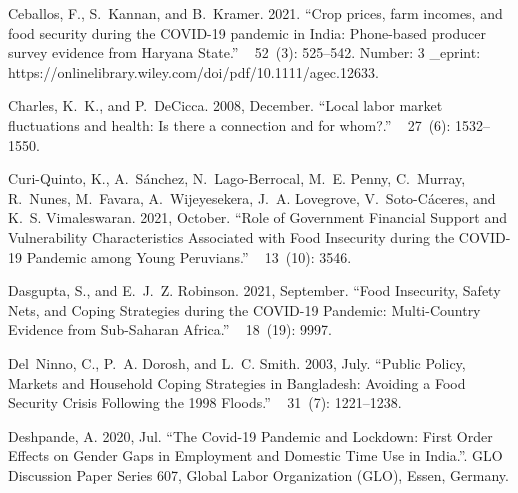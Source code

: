 \documentclass{wber}
\begin{document}
\begin{thebibliography}{}
Ceballos, F., S.~Kannan, and B.~Kramer. 2021.
\newblock ``Crop prices, farm incomes, and food security during the {COVID}-19
  pandemic in {India}: {Phone}-based producer survey evidence from {Haryana}
  {State}.''
~{ 52\/}~(3): 525--542.
\newblock Number: 3 \_eprint:
  https://onlinelibrary.wiley.com/doi/pdf/10.1111/agec.12633.

Charles, K.~K., and P.~DeCicca. 2008, December.
\newblock ``Local labor market fluctuations and health: {Is} there a connection
  and for whom?.''
~{ 27\/}~(6): 1532--1550.

Curi-Quinto, K., A.~S{\'a}nchez, N.~Lago-Berrocal, M.~E. Penny, C.~Murray,
  R.~Nunes, M.~Favara, A.~Wijeyesekera, J.~A. Lovegrove, V.~Soto-C{\'a}ceres,
  and K.~S. Vimaleswaran. 2021, October.
\newblock ``Role of {Government} {Financial} {Support} and {Vulnerability}
  {Characteristics} {Associated} with {Food} {Insecurity} during the {COVID}-19
  {Pandemic} among {Young} {Peruvians}.''
~{ 13\/}~(10): 3546.

Dasgupta, S., and E.~J.~Z. Robinson. 2021, September.
\newblock ``Food {Insecurity}, {Safety} {Nets}, and {Coping} {Strategies}
  during the {COVID}-19 {Pandemic}: {Multi}-{Country} {Evidence} from
  {Sub}-{Saharan} {Africa}.''
~{ 18\/}~(19): 9997.

Del~Ninno, C., P.~A. Dorosh, and L.~C. Smith. 2003, July.
\newblock ``Public {Policy}, {Markets} and {Household} {Coping} {Strategies} in
  {Bangladesh}: {Avoiding} a {Food} {Security} {Crisis} {Following} the 1998
  {Floods}.''
~{ 31\/}~(7):
  1221--1238.

Deshpande, A. 2020, Jul.
\newblock ``The {Covid}-19 {Pandemic} and {Lockdown}: {First} {Order} {Effects}
  on {Gender} {Gaps} in {Employment} and {Domestic} {Time} {Use} in {India}.''.
\newblock GLO Discussion Paper Series 607, Global Labor Organization (GLO),
  Essen, Germany.


\end{thebibliography}
\end{document}

